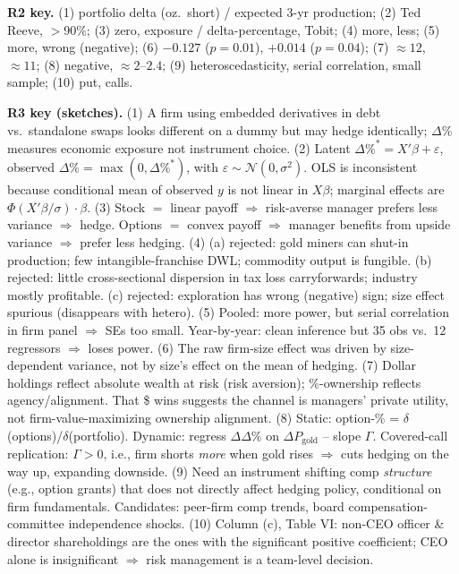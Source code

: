 \documentclass[11pt]{article}
\newcommand{\dP}{\Delta\%}
\begin{document}
\begin{answerbox}
\textbf{R2 key.} (1) portfolio delta (oz.\ short) / expected 3-yr production; (2) Ted Reeve, $>$90\%; (3) zero, exposure / delta-percentage, Tobit; (4) more, less; (5) more, wrong (negative); (6) $-0.127$ ($p=0.01$), $+0.014$ ($p=0.04$); (7) $\approx 12$, $\approx 11$; (8) negative, $\approx 2$--$2.4$; (9) heteroscedasticity, serial correlation, small sample; (10) put, calls.

\medskip
\textbf{R3 key (sketches).}
(1) A firm using embedded derivatives in debt vs.\ standalone swaps looks different on a dummy but may hedge identically; $\dP$ measures economic exposure not instrument choice.
(2) Latent $\dP^*=X'\beta+\varepsilon$, observed $\dP=\max(0,\dP^*)$, with $\varepsilon\sim\mathcal{N}(0,\sigma^2)$. OLS is inconsistent because conditional mean of observed $y$ is not linear in $X\beta$; marginal effects are $\Phi(X'\beta/\sigma)\cdot\beta$.
(3) Stock $=$ linear payoff $\Rightarrow$ risk-averse manager prefers less variance $\Rightarrow$ hedge. Options $=$ convex payoff $\Rightarrow$ manager benefits from upside variance $\Rightarrow$ prefer less hedging.
(4) (a) rejected: gold miners can shut-in production; few intangible-franchise DWL; commodity output is fungible. (b) rejected: little cross-sectional dispersion in tax loss carryforwards; industry mostly profitable. (c) rejected: exploration has wrong (negative) sign; size effect spurious (disappears with hetero).
(5) Pooled: more power, but serial correlation in firm panel $\Rightarrow$ SEs too small. Year-by-year: clean inference but 35 obs vs.\ 12 regressors $\Rightarrow$ loses power.
(6) The raw firm-size effect was driven by size-dependent variance, not by size's effect on the mean of hedging.
(7) Dollar holdings reflect absolute wealth at risk (risk aversion); \%-ownership reflects agency/alignment. That \$ wins suggests the channel is managers' private utility, not firm-value-maximizing ownership alignment.
(8) Static: option-\% = $\delta$(options)/$\delta$(portfolio). Dynamic: regress $\Delta\dP$ on $\Delta P_{\text{gold}}$ -- slope $\Gamma$. Covered-call replication: $\Gamma>0$, i.e., firm shorts \emph{more} when gold rises $\Rightarrow$ cuts hedging on the way up, expanding downside.
(9) Need an instrument shifting comp \emph{structure} (e.g., option grants) that does not directly affect hedging policy, conditional on firm fundamentals. Candidates: peer-firm comp trends, board compensation-committee independence shocks.
(10) Column (c), Table VI: non-CEO officer \& director shareholdings are the ones with the significant positive coefficient; CEO alone is insignificant $\Rightarrow$ risk management is a team-level decision.


\end{answerbox}
\end{document}
